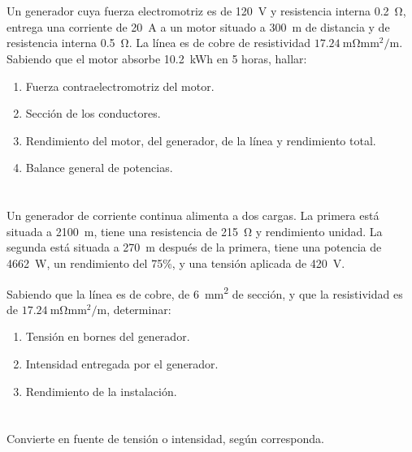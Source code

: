 \documentclass[12pt]{article}
\begin{document}
\title{}

\date{Curso 2020-21}

\section{}

Un generador cuya fuerza electromotriz es de \SI{120}{V} y resistencia interna \SI{0.2}{\ohm}, entrega una corriente de \SI{20}{\ampere} a un motor situado a \SI{300}{\meter} de distancia y de resistencia interna \SI{0.5}{\ohm}. La línea es de cobre de resistividad $\SI{17.24}{\milli\ohm\milli\meter\squared\per\meter}$. Sabiendo que el motor absorbe \SI{10.2}{\kWh} en 5 horas, hallar: 
\begin{enumerate}
\item Fuerza contraelectromotriz del motor.
\item Sección de los conductores.
\item Rendimiento del motor, del generador, de la línea y rendimiento total.
\item Balance general de potencias.
\end{enumerate}

\section{}
Un generador de corriente continua alimenta a dos cargas. La primera está situada a \SI{2100}{\meter}, tiene una resistencia de \SI{215}{\ohm} y rendimiento unidad. La segunda está situada a \SI{270}{\meter} después de la primera, tiene una potencia de \SI{4662}{\watt}, un rendimiento del 75\%, y una tensión aplicada de \SI{420}{\volt}.

Sabiendo que la línea es de cobre, de \SI{6}{\milli\meter\squared} de sección, y que la resistividad es de $\SI{17.24}{\milli\ohm\milli\meter\squared\per\meter}$, determinar:

\begin{enumerate}
\item Tensión en bornes del generador.
\item Intensidad entregada por el generador.
\item Rendimiento de la instalación.
\end{enumerate}

\section{}

Convierte en fuente de tensión o intensidad, según corresponda.
\end{document}
